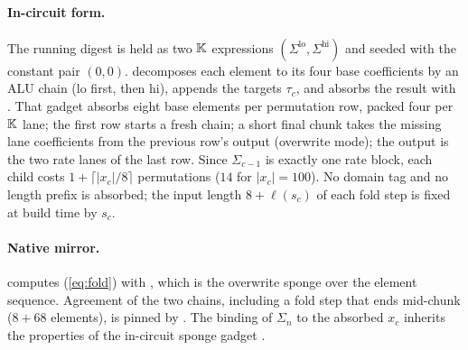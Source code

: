 \paragraph{In-circuit form.}
The running digest is held as two $\mathbb{K}$ expressions $(\Sigma^{\mathrm{lo}},\Sigma^{\mathrm{hi}})$
and seeded with the constant pair $(0,0)$.
 decomposes each element to its four base coefficients by an
ALU chain (lo first, then hi), appends the targets $\tau_c$, and absorbs the result
with .
That gadget absorbs eight base elements per permutation row, packed four per $\mathbb{K}$
lane; the first row starts a fresh chain; a short final chunk takes the missing
lane coefficients from the previous row's output (overwrite mode); the output is
the two rate lanes of the last row.
Since $\Sigma_{c-1}$ is exactly one rate block, each child costs
$1+\lceil |x_c|/8 \rceil$ permutations ($14$ for $|x_c|=100$).
No domain tag and no length prefix is absorbed; the input length
$8+\ell(s_c)$ of each fold step is fixed at build time by $s_c$.

\paragraph{Native mirror.}
 computes (\ref{eq:fold}) with
, which is the overwrite sponge over the
element sequence.
Agreement of the two chains, including a fold step that ends mid-chunk
($8+68$ elements), is pinned by .
The binding of $\Sigma_n$ to the absorbed $x_c$ inherits the properties of the
in-circuit sponge gadget .

